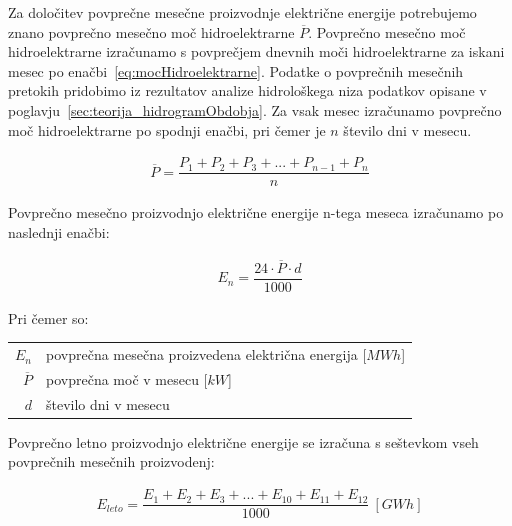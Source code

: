 
Za določitev povprečne mesečne proizvodnje električne energije potrebujemo znano povprečno mesečno moč hidroelektrarne  $\overline{P}$. Povprečno mesečno moč hidroelektrarne izračunamo s povprečjem dnevnih moči hidroelektrarne za iskani mesec po enačbi~\ref{eq:mocHidroelektrarne}. Podatke o povprečnih mesečnih pretokih pridobimo iz rezultatov analize hidrološkega niza podatkov opisane v poglavju~\ref{sec:teorija_hidrogramObdobja}. Za vsak mesec izračunamo povprečno moč hidroelektrarne po spodnji enačbi, pri čemer je $n$ število dni v mesecu. 



\begin{ceqn}
\begin{align}
\overline{P} = \dfrac{P_1 + P_2 + P_3 + ... + P_{n-1} + P_n}{n}
\end{align}
\end{ceqn}



Povprečno mesečno proizvodnjo električne energije n-tega meseca izračunamo po naslednji enačbi:

\begin{ceqn}
\begin{align}
E_n = \dfrac{24 \cdot \overline{P} \cdot d}{1000}
\end{align}
\end{ceqn}

Pri čemer so:
\begin{table}[htb!]
\begin{tabular}{r|p{10cm}}
	$E_n$ & povprečna mesečna proizvedena električna energija [$MWh$]\\
	$\overline{P}$ & povprečna moč v mesecu [$kW$]\\
	$d$ & število dni v mesecu \\
\end{tabular}
\end{table}


Povprečno letno proizvodnjo električne energije se izračuna s seštevkom vseh povprečnih mesečnih proizvodenj:
\begin{ceqn}
	\begin{align}
	E_{leto} =  \dfrac{E_{1} + E_{2} + E_{3} + ... + E_{10} + E_{11} + E_{12}}{1000} ~[GWh]
	\end{align}
\end{ceqn}

